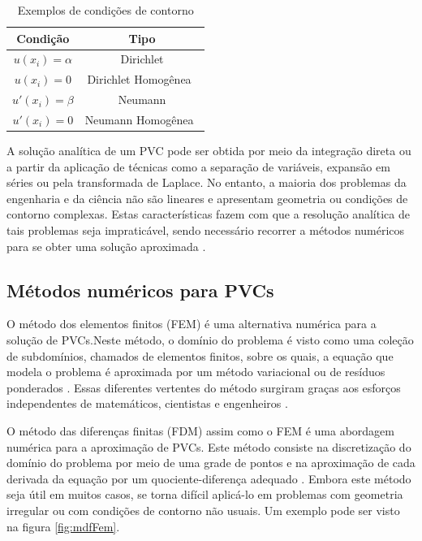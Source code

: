 \documentclass[
    12pt,               %
    openright,          %
    oneside,
    a4paper,            %
    english,            %
    french,             %
    spanish,            %
    brazil              %
    ]{abntex2}
\begin{document}
\begin{table}   
	\centering
	\begin{tabular}{|c|c|}  
		\hline
		\textbf{Condição} 
		& \textbf{Tipo} \\  
		\hline
		$u(x_i) = \alpha $ 
		& Dirichlet \\
		\hline
		$u(x_i) = 0$
		& Dirichlet Homogênea\  \\
		\hline
		$u'(x_i) = \beta$
		& Neumann \\
		\hline
		$u'(x_i) = 0$
		& Neumann Homogênea\  \\
		\hline
	\end{tabular}
	\caption{Exemplos de condições de contorno}
	\label{tab:cond}
\end{table}


A solução analítica de um PVC pode ser obtida por meio da integração direta ou a partir da aplicação de técnicas como a separação de variáveis, expansão em séries ou pela transformada de Laplace.
No entanto, a maioria dos problemas da engenharia e da ciência não são lineares e apresentam geometria ou condições de contorno complexas.  Estas características fazem com que a resolução analítica de tais problemas seja impraticável, sendo necessário recorrer a métodos numéricos para se obter uma solução aproximada \cite{boyceDiprima, powers}.



\subsection{Métodos numéricos para PVCs}
\label{sec:FEM}

O método dos elementos finitos (FEM) é uma alternativa numérica para a solução de PVCs.Neste método, o domínio do problema é visto como uma coleção de subdomínios, chamados de elementos finitos, sobre os quais, a equação que modela o problema é aproximada por um método variacional ou de resíduos ponderados . Essas diferentes vertentes do método surgiram graças aos esforços independentes de matemáticos, cientistas e engenheiros \cite{zien}. 

O método das diferenças finitas (FDM) assim como o FEM é uma abordagem numérica para a aproximação de PVCs. Este método consiste na discretização do domínio do problema por meio de uma grade de pontos e na aproximação de cada derivada da equação por um quociente-diferença adequado
\cite{burdenFaires}. Embora este método seja útil em muitos casos, se torna difícil aplicá-lo em problemas com geometria irregular ou com condições de contorno não usuais. Um exemplo pode ser visto na figura \ref{fig:mdfFem}.
\end{document}
